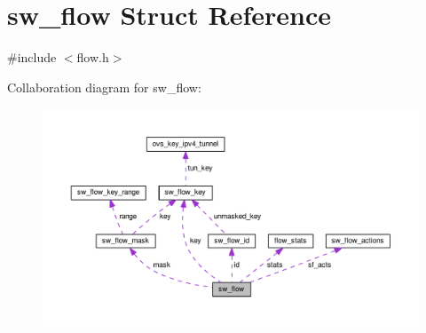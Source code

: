 \hypertarget{structsw__flow}{}\section{sw\+\_\+flow Struct Reference}
\label{structsw__flow}


{\ttfamily \#include $<$flow.\+h$>$}



Collaboration diagram for sw\+\_\+flow\+:
\nopagebreak
\begin{figure}[H]
\begin{center}
\leavevmode
\includegraphics[width=350pt]{structsw__flow__coll__graph}
\end{center}
\end{figure}
